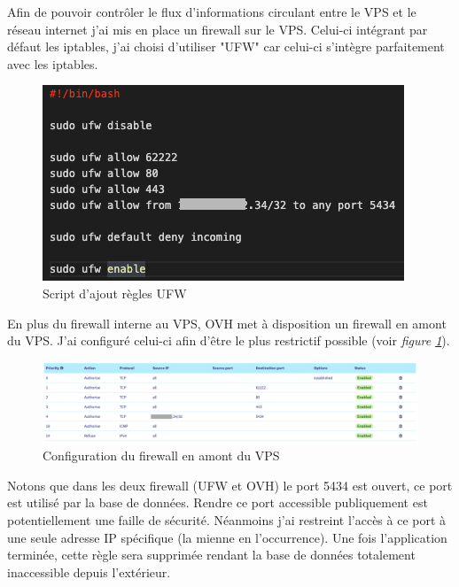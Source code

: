 \newparasm
\begin{minipage}{.5\textwidth}
  Afin de pouvoir contrôler le flux d'informations circulant entre le VPS et le réseau internet j'ai mis en place un firewall sur le VPS. Celui-ci intégrant par défaut les iptables\footnotemark, j'ai choisi d'utiliser "UFW" car celui-ci s'intègre parfaitement avec les iptables.  
\end{minipage}
\begin{minipage}{.5\textwidth}
  \begin{figure}[H]
    \centering
    \includegraphics[width=0.8\linewidth]{img/ufw-script.png}
    \caption{Script d'ajout règles UFW}
  \end{figure}
\end{minipage}


\newparasm
En plus du firewall interne au VPS, OVH met à disposition un firewall en amont du VPS. J'ai configuré celui-ci afin d'être le plus restrictif possible (voir \textit{figure \ref{VPS-firewall}}).
\begin{figure}[H]
  \centering
  \includegraphics[width=\linewidth]{img/ovh-fireWall.png}
  \caption{Configuration du firewall en amont du VPS}
  \label{VPS-firewall}
\end{figure}

\newpara
\newpara

Notons que dans les deux firewall (UFW et OVH) le port 5434 est ouvert, ce port est utilisé par la base de données. Rendre ce port accessible publiquement est potentiellement une faille de sécurité. Néanmoins j'ai restreint l'accès à ce port à une seule adresse IP spécifique (la mienne en l'occurrence). Une fois l'application terminée, cette règle sera supprimée rendant la base de données totalement inaccessible depuis l'extérieur. 


